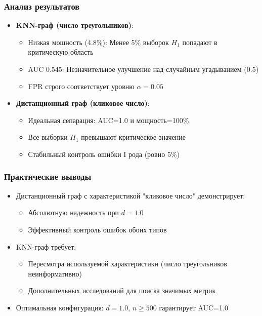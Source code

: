 \documentclass[a4paper, 12pt]{article}
\begin{document}
\subsubsection*{Анализ результатов}
\begin{itemize}
    \item \textbf{KNN-граф (число треугольников)}:
        \begin{itemize}
            \item Низкая мощность (4.8\%): Менее 5\% выборок \(H_1\) попадают в критическую область
            \item AUC 0.545: Незначительное улучшение над случайным угадыванием (0.5)
            \item FPR строго соответствует уровню \(\alpha=0.05\)
        \end{itemize}
        
    \item \textbf{Дистанционный граф (кликовое число)}:
        \begin{itemize}
            \item Идеальная сепарация: AUC=1.0 и мощность=100\% 
            \item Все выборки \(H_1\) превышают критическое значение
            \item Стабильный контроль ошибки I рода (ровно 5\%)
        \end{itemize}
\end{itemize}

\subsubsection*{Практические выводы}
\begin{itemize}
    \item Дистанционный граф с характеристикой "кликовое число" демонстрирует:
        \begin{itemize}
            \item Абсолютную надежность при \(d=1.0\)
            \item Эффективный контроль ошибок обоих типов
        \end{itemize}
    \item KNN-граф требует:
        \begin{itemize}
            \item Пересмотра используемой характеристики (число треугольников неинформативно)
            \item Дополнительных исследований для поиска значимых метрик
        \end{itemize}
    \item Оптимальная конфигурация: \(d=1.0\), \(n \geq 500\) гарантирует AUC=1.0
\end{itemize}
\end{document}

